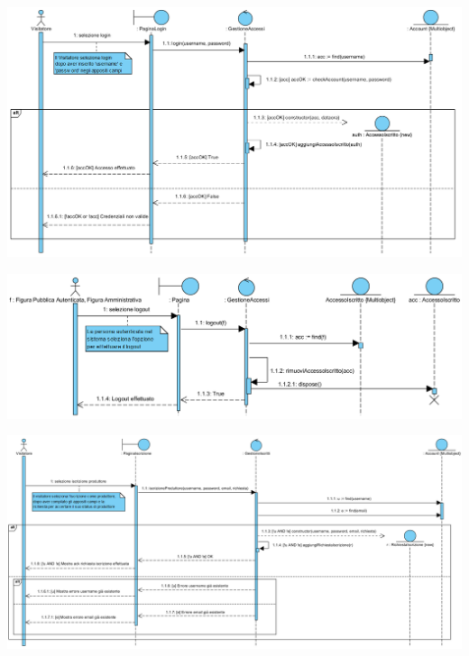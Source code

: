 \begin{landscape}
\begin{center}
			\includegraphics[width=\linewidth]{assets/visualParadigm/sequenza/login}
\end{center}
\end{landscape}

\begin{landscape}
\begin{center}
			\includegraphics[width=\linewidth]{assets/visualParadigm/sequenza/logout}
\end{center}
\end{landscape}

\begin{landscape}
\begin{center}
			\includegraphics[width=\linewidth]{assets/visualParadigm/sequenza/iscrizioneProduttore}
\end{center}
\end{landscape}


